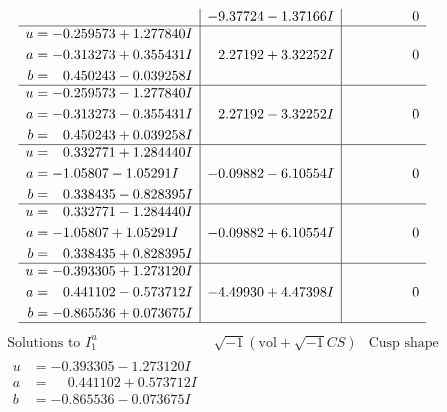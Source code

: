 \documentclass[1p]{elsarticle_modified}
\theoremstyle{definition}
\newcommand{\I}{\sqrt{-1}}
\begin{document}
$$\begin{array}{c|c|c}
 & -9.37724 - 1.37166 I & \phantom{-0.000000 } 0 \\ \hline\begin{aligned}
u &= -0.259573 + 1.277840 I \\
a &= -0.313273 + 0.355431 I \\
b &= \phantom{-}0.450243 - 0.039258 I\end{aligned}
 & \phantom{-}2.27192 + 3.32252 I & \phantom{-0.000000 } 0 \\ \hline\begin{aligned}
u &= -0.259573 - 1.277840 I \\
a &= -0.313273 - 0.355431 I \\
b &= \phantom{-}0.450243 + 0.039258 I\end{aligned}
 & \phantom{-}2.27192 - 3.32252 I & \phantom{-0.000000 } 0 \\ \hline\begin{aligned}
u &= \phantom{-}0.332771 + 1.284440 I \\
a &= -1.05807 - 1.05291 I \\
b &= \phantom{-}0.338435 - 0.828395 I\end{aligned}
 & -0.09882 - 6.10554 I & \phantom{-0.000000 } 0 \\ \hline\begin{aligned}
u &= \phantom{-}0.332771 - 1.284440 I \\
a &= -1.05807 + 1.05291 I \\
b &= \phantom{-}0.338435 + 0.828395 I\end{aligned}
 & -0.09882 + 6.10554 I & \phantom{-0.000000 } 0 \\ \hline\begin{aligned}
u &= -0.393305 + 1.273120 I \\
a &= \phantom{-}0.441102 - 0.573712 I \\
b &= -0.865536 + 0.073675 I\end{aligned}
 & -4.49930 + 4.47398 I & \phantom{-0.000000 } 0\\
 \hline 
 \end{array}$$\newpage$$\begin{array}{c|c|c}  
\text{Solutions to }I^u_{1}& \I (\text{vol} + \sqrt{-1}CS) & \text{Cusp shape}\\
 \hline 
\begin{aligned}
u &= -0.393305 - 1.273120 I \\
a &= \phantom{-}0.441102 + 0.573712 I \\
b &= -0.865536 - 0.073675 I\end{aligned}

\end{array}$$
\end{document}
